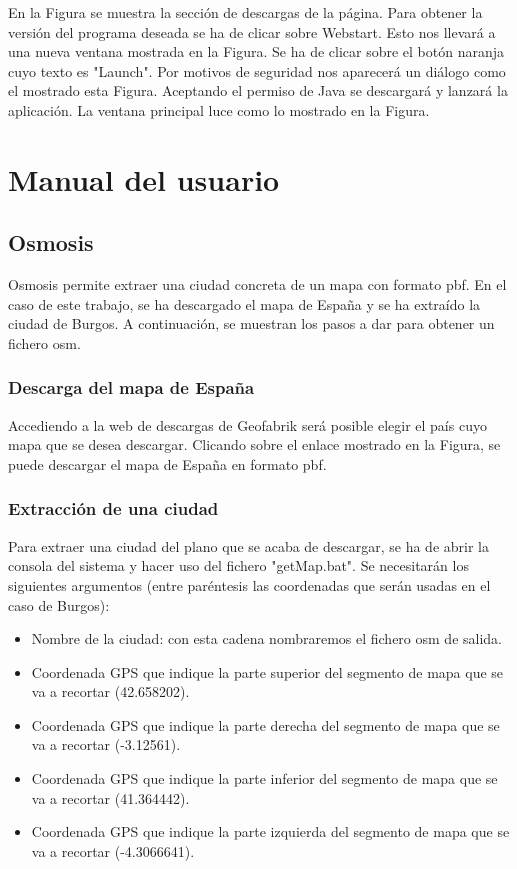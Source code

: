 En la Figura se muestra la sección de descargas de la página. Para obtener la versión del programa deseada se ha de clicar sobre Webstart. Esto nos llevará a una nueva ventana mostrada en la Figura. Se ha de clicar sobre el botón naranja cuyo texto es "Launch". Por motivos de seguridad nos aparecerá un diálogo como el mostrado esta Figura. Aceptando el permiso de Java se descargará y lanzará la aplicación. La ventana principal luce como lo mostrado en la Figura.


\section{Manual del usuario}

\subsection{Osmosis}
Osmosis permite extraer una ciudad concreta de un mapa con formato pbf. En el caso de este trabajo, se ha descargado el mapa de España y se ha extraído la ciudad de Burgos. A continuación, se muestran los pasos a dar para obtener un fichero osm.

\subsubsection{Descarga del mapa de España}
Accediendo a la web de descargas de Geofabrik será posible elegir el país cuyo mapa que se desea descargar. Clicando sobre el enlace mostrado en la Figura, se puede descargar el mapa de España en formato pbf.

\subsubsection{Extracción de una ciudad}
Para extraer una ciudad del plano que se acaba de descargar, se ha de abrir la consola del sistema y hacer uso del fichero "getMap.bat". Se necesitarán los siguientes argumentos (entre paréntesis las coordenadas que serán usadas en el caso de Burgos):
\begin{itemize}
	\item Nombre de la ciudad: con esta cadena nombraremos el fichero osm de salida.
	\item Coordenada GPS que indique la parte superior del segmento de mapa que se va a recortar (42.658202).
	\item Coordenada GPS que indique la parte derecha del segmento de mapa que se va a recortar (-3.12561).
	\item Coordenada GPS que indique la parte inferior del segmento de mapa que se va a recortar (41.364442).
	\item Coordenada GPS que indique la parte izquierda del segmento de mapa que se va a recortar (-4.3066641).
\end{itemize}

